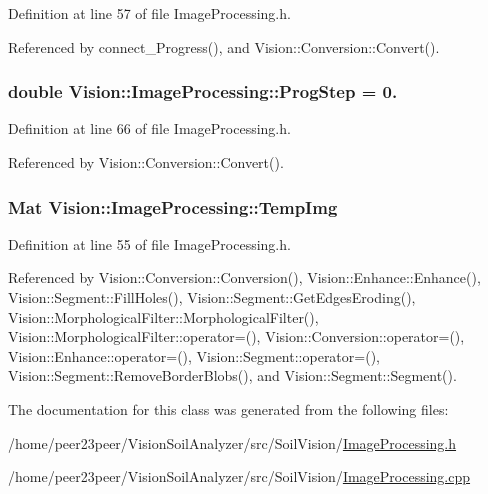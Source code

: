 Definition at line 57 of file Image\+Processing.\+h.



Referenced by connect\+\_\+\+Progress(), and Vision\+::\+Conversion\+::\+Convert().

\hypertarget{class_vision_1_1_image_processing_a7438451f9a447a33e9f04bf8e73eae31}{}
\subsubsection[{Prog\+Step}]{\setlength{\rightskip}{0pt plus 5cm}double Vision\+::\+Image\+Processing\+::\+Prog\+Step = 0.}\label{class_vision_1_1_image_processing_a7438451f9a447a33e9f04bf8e73eae31}


Definition at line 66 of file Image\+Processing.\+h.



Referenced by Vision\+::\+Conversion\+::\+Convert().

\hypertarget{class_vision_1_1_image_processing_a5371ad8d6f7aac9d43ee5c902ade7435}{}
\subsubsection[{Temp\+Img}]{\setlength{\rightskip}{0pt plus 5cm}Mat Vision\+::\+Image\+Processing\+::\+Temp\+Img\hspace{0.3cm}{\ttfamily [protected]}}\label{class_vision_1_1_image_processing_a5371ad8d6f7aac9d43ee5c902ade7435}


Definition at line 55 of file Image\+Processing.\+h.



Referenced by Vision\+::\+Conversion\+::\+Conversion(), Vision\+::\+Enhance\+::\+Enhance(), Vision\+::\+Segment\+::\+Fill\+Holes(), Vision\+::\+Segment\+::\+Get\+Edges\+Eroding(), Vision\+::\+Morphological\+Filter\+::\+Morphological\+Filter(), Vision\+::\+Morphological\+Filter\+::operator=(), Vision\+::\+Conversion\+::operator=(), Vision\+::\+Enhance\+::operator=(), Vision\+::\+Segment\+::operator=(), Vision\+::\+Segment\+::\+Remove\+Border\+Blobs(), and Vision\+::\+Segment\+::\+Segment().



The documentation for this class was generated from the following files\+:\begin{DoxyCompactItemize}
\item 
/home/peer23peer/\+Vision\+Soil\+Analyzer/src/\+Soil\+Vision/\hyperlink{_image_processing_8h}{Image\+Processing.\+h}\item 
/home/peer23peer/\+Vision\+Soil\+Analyzer/src/\+Soil\+Vision/\hyperlink{_image_processing_8cpp}{Image\+Processing.\+cpp}\end{DoxyCompactItemize}
